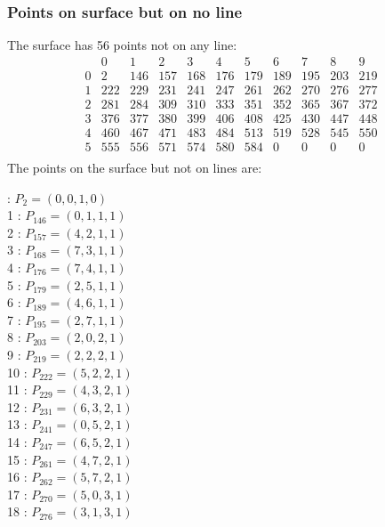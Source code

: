 \documentclass{article}
\begin{document}
{\subsubsection*{Points on surface but on no line}
The surface has 56 points not on any line:\\
$$
\begin{array}{r|*{10}{r}}
 & 0 & 1 & 2 & 3 & 4 & 5 & 6 & 7 & 8 & 9\\
\hline
0 & 2 & 146 & 157 & 168 & 176 & 179 & 189 & 195 & 203 & 219\\
1 & 222 & 229 & 231 & 241 & 247 & 261 & 262 & 270 & 276 & 277\\
2 & 281 & 284 & 309 & 310 & 333 & 351 & 352 & 365 & 367 & 372\\
3 & 376 & 377 & 380 & 399 & 406 & 408 & 425 & 430 & 447 & 448\\
4 & 460 & 467 & 471 & 483 & 484 & 513 & 519 & 528 & 545 & 550\\
5 & 555 & 556 & 571 & 574 & 580 & 584 & 0 & 0 & 0 & 0\\
\end{array}
$$
The points on the surface but not on lines are:\\
\begin{multicols}{2}
 : $P_{2}=( 0, 0, 1, 0 )$\\
1 : $P_{146}=( 0, 1, 1, 1 )$\\
2 : $P_{157}=( 4, 2, 1, 1 )$\\
3 : $P_{168}=( 7, 3, 1, 1 )$\\
4 : $P_{176}=( 7, 4, 1, 1 )$\\
5 : $P_{179}=( 2, 5, 1, 1 )$\\
6 : $P_{189}=( 4, 6, 1, 1 )$\\
7 : $P_{195}=( 2, 7, 1, 1 )$\\
8 : $P_{203}=( 2, 0, 2, 1 )$\\
9 : $P_{219}=( 2, 2, 2, 1 )$\\
10 : $P_{222}=( 5, 2, 2, 1 )$\\
11 : $P_{229}=( 4, 3, 2, 1 )$\\
12 : $P_{231}=( 6, 3, 2, 1 )$\\
13 : $P_{241}=( 0, 5, 2, 1 )$\\
14 : $P_{247}=( 6, 5, 2, 1 )$\\
15 : $P_{261}=( 4, 7, 2, 1 )$\\
16 : $P_{262}=( 5, 7, 2, 1 )$\\
17 : $P_{270}=( 5, 0, 3, 1 )$\\
18 : $P_{276}=( 3, 1, 3, 1 )$\\

\end{multicols}}
\end{document}
